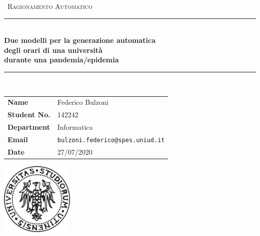 \documentclass[12pt,english, openany]{book}
\begin{document}

\begin{titlepage}
	\clearpage\thispagestyle{empty}
	\centering
	\vspace{1cm}

	{\
		\textsc{Ragionamento Automatico}
	}
		\vspace{2.5cm}
		
	\rule{\linewidth}{2mm} \\[0.5cm]
	{ \Huge \bfseries Due modelli per la generazione automatica\\[0.2em]
		degli orari di una università\\[0.2em]
		durante una pandemia/epidemia}\\[0.5cm]
	\rule{\linewidth}{0.6mm} \\[3.4cm]

	\hspace{2cm}
		\begin{tabular}{l p{5cm}}
		\textbf{Name} & Federico Bulzoni \\[10pt]
		\textbf{Student No.} & 142242 \\[10pt]
		\textbf{Department} & Informatica \\[10pt]
		\textbf{Email} & \texttt{bulzoni.federico@spes.uniud.it} \\[10pt]
		\textbf{Date} &  27/07/2020\\            
		\end{tabular}
   
    
    \vfill
    \centering \includegraphics[height=3.5cm]{logo_uniud}\\ %
    \vspace{0.5cm}

		
	
	
	\pagebreak

\end{titlepage}
\end{document}
